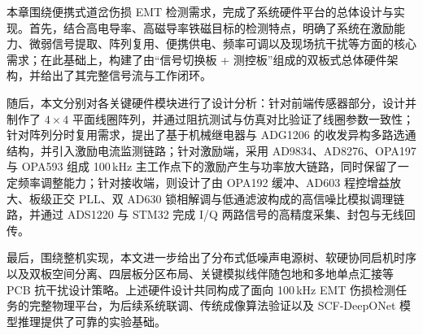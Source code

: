本章围绕便携式道岔伤损 EMT 检测需求，完成了系统硬件平台的总体设计与实现。首先，结合高电导率、高磁导率铁磁目标的检测特点，明确了系统在激励能力、微弱信号提取、阵列复用、便携供电、频率可调以及现场抗干扰等方面的核心需求；在此基础上，构建了由``信号切换板 + 测控板''组成的双板式总体硬件架构，并给出了其完整信号流与工作闭环。

随后，本文分别对各关键硬件模块进行了设计分析：针对前端传感器部分，设计并制作了 $4\times4$ 平面线圈阵列，并通过阻抗测试与仿真对比验证了线圈参数一致性；针对阵列分时复用需求，提出了基于机械继电器与 ADG1206 的收发异构多路选通结构，并引入激励电流监测链路；针对激励端，采用 AD9834、AD8276、OPA197 与 OPA593 组成 100\,kHz 主工作点下的激励产生与功率放大链路，同时保留了一定频率调整能力；针对接收端，则设计了由 OPA192 缓冲、AD603 程控增益放大、板级正交 PLL、双 AD630 锁相解调与低通滤波构成的高信噪比模拟调理链路，并通过 ADS1220 与 STM32 完成 I/Q 两路信号的高精度采集、封包与无线回传。

最后，围绕整机实现，本文进一步给出了分布式低噪声电源树、软硬协同启机时序以及双板空间分离、四层板分区布局、关键模拟线伴随包地和多地单点汇接等 PCB 抗干扰设计策略。上述硬件设计共同构成了面向 100\,kHz EMT 伤损检测任务的完整物理平台，为后续系统联调、传统成像算法验证以及 SCF-DeepONet 模型推理提供了可靠的实验基础。
